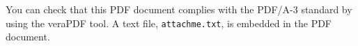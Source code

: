 \documentclass{article}
\begin{document}
You can check that this PDF document complies with the PDF/A-3 standard by using the veraPDF tool. A text file, \texttt{attachme.txt}, is embedded in the PDF document. 

\end{document}
